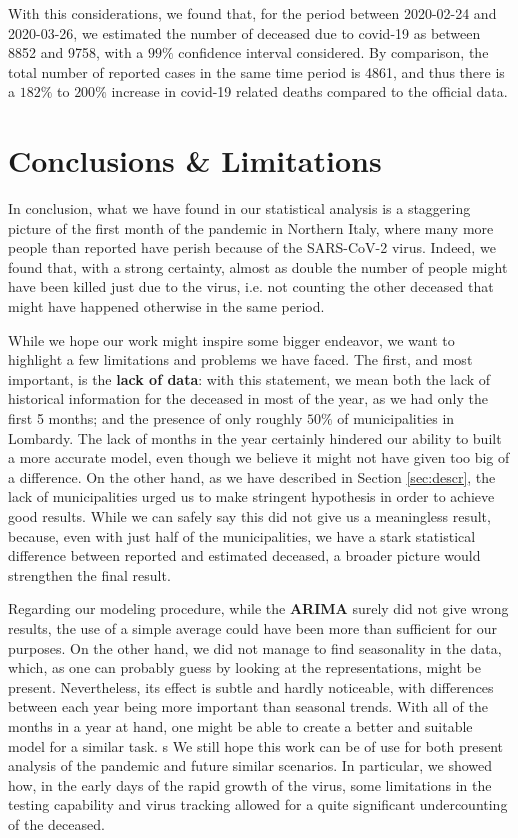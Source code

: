 \documentclass[11pt,a4paper,final]{paper}
\begin{document}
With this considerations, we found that, for the period between 2020-02-24 and 2020-03-26, we estimated the number of deceased due to covid-19 as between 8852 and  9758, with a $99\%$ confidence interval considered. 
By comparison, the total number of reported cases in the same time period is 4861, and thus there is a $182\%$ to $200\%$ increase in covid-19 related deaths compared to the official data. 

\clearpage
\section{Conclusions \& Limitations}
In conclusion, what we have found in our statistical analysis is a staggering picture of the first month of the pandemic in Northern Italy, where many more people than reported have perish because of the SARS-CoV-2 virus. Indeed, we found that, with a strong certainty, almost as double the number of people might have been killed just due to the virus, i.e. not counting the other deceased that might have happened otherwise in the same period. 

While we hope our work might inspire some bigger endeavor, we want to highlight a few limitations and problems we have faced. The first, and most important, is the \textbf{lack of data}: with this statement, we mean both the lack of historical information for the deceased in most of the year, as we had only the first 5 months; and the presence of only roughly $50\%$ of municipalities in Lombardy. The lack of months in the year certainly hindered our ability to built a more accurate model, even though we believe it might not have given too big of a difference. On the other hand, as we have described in Section \ref{sec:descr}, the lack of municipalities urged us to make stringent hypothesis in order to achieve good results. While we can safely say this did not give us a meaningless result, because, even with just half of the municipalities, we have a stark statistical difference between reported and estimated deceased, a broader picture would strengthen the final result. 

Regarding our modeling procedure, while the \textbf{ARIMA} surely did not give wrong results, the use of a simple average could have been more than sufficient for our purposes. On the other hand, we did not manage to find seasonality in the data, which, as one can probably guess by looking at the representations, might be present. Nevertheless, its effect is subtle and hardly noticeable, with differences between each year being more important than seasonal trends. With all of the months in a year at hand, one might be able to create a better and suitable model for a similar task.
s
We still hope this work can be of use for both present analysis of the pandemic and future similar scenarios. In particular, we showed how, in the early days of the rapid growth of the virus, some limitations in the testing capability and virus tracking allowed for a quite significant undercounting of the deceased.
\end{document}
